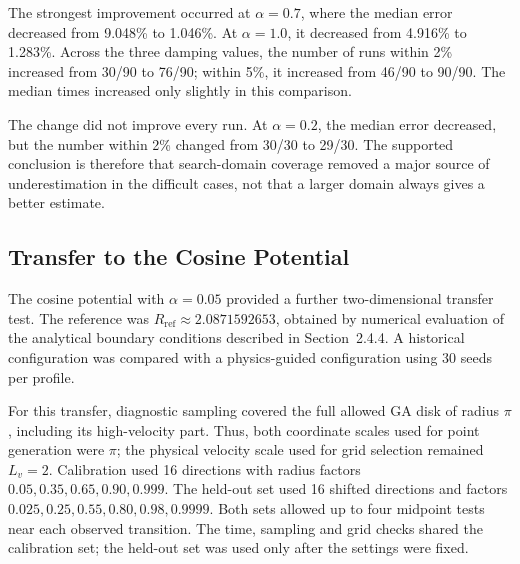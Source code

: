 
The strongest improvement occurred at $\alpha=0.7$, where the median error decreased from 9.048\% to 1.046\%. At $\alpha=1.0$, it decreased from 4.916\% to 1.283\%. Across the three damping values, the number of runs within 2\% increased from 30/90 to 76/90; within 5\%, it increased from 46/90 to 90/90. The median times increased only slightly in this comparison.

The change did not improve every run. At $\alpha=0.2$, the median error decreased, but the number within 2\% changed from 30/30 to 29/30. The supported conclusion is therefore that search-domain coverage removed a major source of underestimation in the difficult cases, not that a larger domain always gives a better estimate.

\subsection{Transfer to the Cosine Potential}

The cosine potential with $\alpha=0.05$ provided a further two-dimensional transfer test. The reference was $R_{\mathrm{ref}}\approx2.0871592653$, obtained by numerical evaluation of the analytical boundary conditions described in Section~2.4.4. A historical configuration was compared with a physics-guided configuration using 30 seeds per profile.

For this transfer, diagnostic sampling covered the full allowed GA disk of radius $\pi$, including its high-velocity part. Thus, both coordinate scales used for point generation were $\pi$; the physical velocity scale used for grid selection remained $L_v=2$. Calibration used 16 directions with radius factors $0.05,0.35,0.65,0.90,0.999$. The held-out set used 16 shifted directions and factors $0.025,0.25,0.55,0.80,0.98,0.9999$. Both sets allowed up to four midpoint tests near each observed transition. The time, sampling and grid checks shared the calibration set; the held-out set was used only after the settings were fixed.

